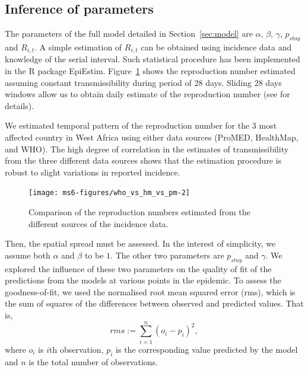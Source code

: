 \documentclass[11pt,]{article}
\begin{document}
\subsection{Inference of parameters}

The parameters of the full model detailed in Section~\ref{sec:model} are
$\alpha$, $\beta$, $\gamma$, $p_{stay}$ and $R_{i, t}$. A simple
estimation of $R_{i, t}$ can be obtained using incidence data and knowledge of the serial interval.
Such statistical procedure has been implemented in the
R package EpiEstim. Figure~\ref{fig:r_comp} shows the
reproduction number estimated assuming constant transmissibility during period of 28 days. 
Sliding  28 days windows allow us to obtain daily estimate of the reproduction number (see \citep{cori2013new} for details).

We estimated temporal pattern of the reproduction number for the 3 most affected country in West Africa
using either data sources (ProMED, HealthMap, and WHO).
The high degree of correlation in the estimates of transmissibility from the three
different data sources shows that the estimation procedure is robust
to slight variations in reported incidence.

\begin{figure}
  \centering
  \texttt{[image: ms6-figures/who\_vs\_hm\_vs\_pm-2]}
  \caption{Comparison of the reproduction numbers estimated from
        the different sources of the incidence data.}
  \label{fig:r_comp}
\end{figure}

\FloatBarrier
Then, the spatial spread must be assessed.
In the interest of simplicity, we assume both
$\alpha$ and $\beta$ to be $1$. The other two parameters are
$p_{stay}$ and $\gamma$. We explored the influence of these two
parameters on the quality of fit of the predictions from the models at various points in the
epidemic. To assess the goodness-of-fit, we used the normalised root mean squared
error (rms), which is the sum of squares of the differences between
observed and predicted values. That is, 
\[ rms := \sum_{i = 1}^n{\left(o_i - p_i\right)^2},\]
where $o_i$ is $i$th observation, $p_i$ is the corresponding value
predicted by the model and $n$ is the total number of observations.
\end{document}
